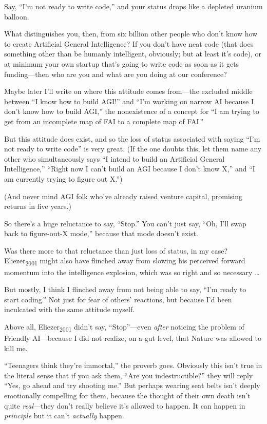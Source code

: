 {
 Say, ``I'm not ready to write
code,'' and your status drops like a depleted uranium
balloon.}

{
 What distinguishes you, then, from six billion other people who
don't know how to create Artificial General
Intelligence? If you don't have neat code (that does
something other than be humanly intelligent, obviously; but at least
it's code), or at minimum your own startup
that's going to write code as soon as it gets
funding---then who are you and what are you doing at our conference?}

{
 Maybe later I'll write on where this attitude
comes from---the excluded middle between ``I know how
to build AGI!'' and
``I'm working on narrow AI because I
don't know how to build AGI,'' the
nonexistence of a concept for ``I am trying to get
from an incomplete map of FAI to a complete map of
FAI.''}

{
 But this attitude does exist, and so the loss of status associated
with saying ``I'm not ready to write
code'' is very great. (If the one doubts this, let
them name any other who simultaneously says ``I intend
to build an Artificial General Intelligence,''
``Right now I can't build an AGI
because I don't know X,'' and
``I am currently trying to figure out
X.'')}

{
 (And never mind AGI folk who've already raised
venture capital, promising returns in five years.)}

{
 So there's a huge reluctance to say,
``Stop.'' You can't
just say, ``Oh, I'll swap back to
figure-out-X mode,'' because that mode
doesn't exist.}

{
 Was there more to that reluctance than just loss of status, in my
case? Eliezer\textsubscript{2001} might also have flinched away from
slowing his perceived forward momentum into the intelligence explosion,
which was so right and so necessary \ldots}

{
 But mostly, I think I flinched away from not being able to say,
``I'm ready to start
coding.'' Not just for fear of
others' reactions, but because I'd been
inculcated with the same attitude myself.}

{
 Above all, Eliezer\textsubscript{2001} didn't say,
``Stop''---even \textit{after}
noticing the problem of Friendly AI---because I did not realize, on a
gut level, that Nature was allowed to kill me.}

{
 ``Teenagers think they're
immortal,'' the proverb goes. Obviously this
isn't true in the literal sense that if you ask them,
``Are you indestructible?'' they
will reply ``Yes, go ahead and try shooting
me.'' But perhaps wearing seat belts
isn't deeply emotionally compelling for them, because
the thought of their own death isn't quite
\textit{real}{}---they don't really believe
it's allowed to happen. It can happen in
\textit{principle} but it can't \textit{actually}
happen.}

